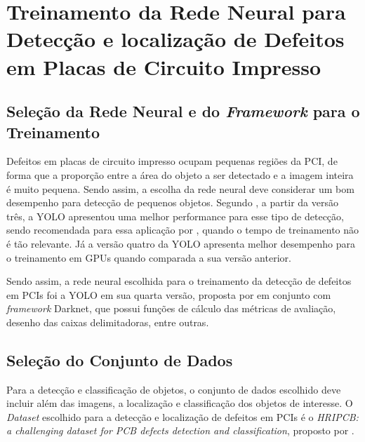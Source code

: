 \chapter{Treinamento da Rede Neural para Detecção e localização de Defeitos em Placas de Circuito Impresso} \label{cap:treinamento}

\section{Seleção da Rede Neural e do \textit{Framework} para o Treinamento} \label{cap:treinamento-rn}

Defeitos em placas de circuito impresso ocupam pequenas regiões da PCI, de forma que a proporção entre a área do objeto a ser detectado e a imagem inteira é muito pequena. Sendo assim, a escolha da rede neural deve considerar um bom desempenho para detecção de pequenos objetos. Segundo , a partir da versão três, a YOLO apresentou uma melhor performance para esse tipo de detecção, sendo recomendada para essa aplicação por , quando o tempo de treinamento não é tão relevante. Já a versão quatro da YOLO apresenta melhor desempenho para o treinamento em GPUs quando comparada a sua versão anterior.

Sendo assim, a rede neural escolhida para o treinamento da detecção de defeitos em PCIs foi a YOLO em sua quarta versão, proposta por  em conjunto com \textit{framework} Darknet, que possui funções de cálculo das métricas de avaliação, desenho das caixas delimitadoras, entre outras.

\section{Seleção do Conjunto de Dados} \label{cap:treinamento-dataset}

Para a detecção e classificação de objetos, o conjunto de dados escolhido deve incluir além das imagens, a localização e classificação dos objetos de interesse.
O \textit{Dataset} escolhido para a detecção e localização de defeitos em PCIs é o \textit{HRIPCB: a challenging dataset for PCB defects detection and classification}, proposto por .

